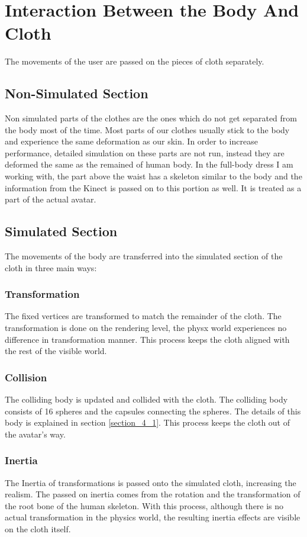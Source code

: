 \section{Interaction Between the Body And Cloth}
\label{section2_4}
The movements of the user are passed on the pieces of cloth separately.

\subsection{Non-Simulated Section}
Non simulated parts of the clothes are the ones which do not get separated from
the body most of the time. Most parts of our clothes usually stick to the body and experience the same deformation as our skin. In order to increase performance, detailed simulation on these parts are not run, instead they are deformed the same as the remained of human body. In the full-body dress I am working with, the part above the waist has a skeleton similar to the body and the information from the Kinect is passed on to this portion as well. It is treated as a part of the actual avatar.

\subsection{Simulated Section}
The movements of the body are transferred into the simulated section of the cloth in three main ways:

\subsubsection{Transformation}
The fixed vertices are transformed to match the remainder of the cloth. The
transformation is done on the rendering level, the physx world experiences no difference in transformation manner. This process keeps the cloth aligned with the rest of the visible world.

\subsubsection{Collision}
The colliding body is updated and collided with the cloth. The colliding body
consists of 16 spheres and the capsules connecting the spheres. The details of
this body is explained in section \ref{section_4_1}. This process keeps the
cloth out of the avatar’s way.

\subsubsection{Inertia}
The Inertia of transformations is passed onto the simulated cloth, increasing
the realism. The passed on inertia comes from the rotation and the transformation of the root bone of the human skeleton. With this process, although there is no actual transformation in the physics world, the resulting inertia effects are visible on the cloth itself. 

